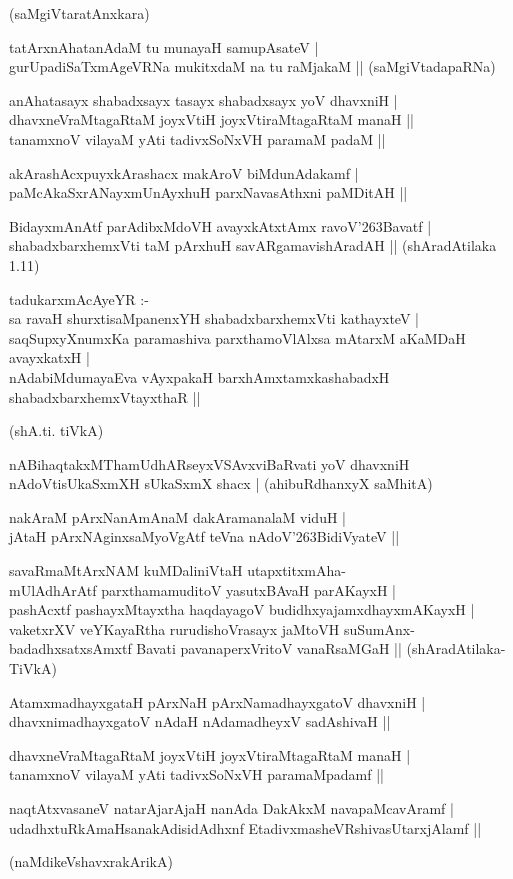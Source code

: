 \begin{itemize}
{\hfill{(saMgiVtaratAnxkara)} 
\item[47.] tatArxnAhatanAdaM tu munayaH samupAsateV |\\\label{151}
gurUpadiSaTxmAgeVRNa mukitxdaM na tu raMjakaM ||
\hfill{(saMgiVtadapaRNa)}
\item[48.] anAhatasayx shabadxsayx tasayx shabadxsayx yoV dhavxniH |\\\label{151}
dhavxneVraMtagaRtaM joyxVtiH joyxVtiraMtagaRtaM manaH ||\\
tanamxnoV vilayaM yAti tadivxSoNxVH paramaM padaM ||
\item[49.] akArashAcxpuyxkArashacx makAroV biMdunAdakamf |\\\label{151}
paMcAkaSxrANayxmUnAyxhuH parxNavasAthxni paMDitAH ||\label{161}
\item[50.] BidayxmAnAtf parAdibxMdoVH avayxkAtxtAmx ravoV\char'263Bavatf |\\\label{151}
shabadxbarxhemxVti taM pArxhuH savARgamavishAradAH ||
\hfill{(shAradAtilaka 1.11)}
\item[51.] tadukarxmAcAyeYR :-\\
sa ravaH shurxtisaMpanenxYH shabadxbarxhemxVti kathayxteV |\\\label{151}
saqSupxyXnumxKa paramashiva parxthamoVlAlxsa mAtarxM aKaMDaH avayxkatxH |\\
nAdabiMdumayaEva vAyxpakaH barxhAmxtamxkashabadxH shabadxbarxhemxVtayxthaR ||

\hfill{(shA.ti. tiVkA)}
\item[52.] nABihaqtakxMThamUdhARseyxVSAvxviBaRvati yoV dhavxniH \\\label{151}
nAdoVtisUkaSxmXH sUkaSxmX shacx |
\hfill{(ahibuRdhanxyX saMhitA)}
\item[53.] nakAraM pArxNanAmAnaM dakAramanalaM viduH |\\\label{151}
jAtaH pArxNAginxsaMyoVgAtf teVna nAdoV\char'263BidiVyateV ||
\item[54.] savaRmaMtArxNAM kuMDaliniVtaH utapxtitxmAha-\\
mUlAdhArAtf parxthamamuditoV yasutxBAvaH parAKayxH |\\\label{152}
pashAcxtf pashayxMtayxtha haqdayagoV budidhxyajamxdhayxmAKayxH |\\
vaketxrXV veYKayaRtha rurudishoVrasayx jaMtoVH suSumAnx-\\
badadhxsatxsAmxtf Bavati pavanaperxVritoV vanaRsaMGaH ||
\hfill{(shAradAtilaka- TiVkA)}
\item[55.] AtamxmadhayxgataH pArxNaH pArxNamadhayxgatoV dhavxniH |\\\label{152}
dhavxnimadhayxgatoV nAdaH nAdamadheyxV sadAshivaH ||
\item[56.] dhavxneVraMtagaRtaM joyxVtiH joyxVtiraMtagaRtaM manaH |\\
tanamxnoV vilayaM yAti tadivxSoNxVH paramaMpadamf ||
\item[57.] naqtAtxvasaneV natarAjarAjaH nanAda DakAkxM navapaMcavAramf |\\\label{152}
udadhxtuRkAmaHsanakAdisidAdhxnf EtadivxmasheVRshivasUtarxjAlamf ||

\hfill{(naMdikeVshavxrakArikA)}}
\end{itemize}
